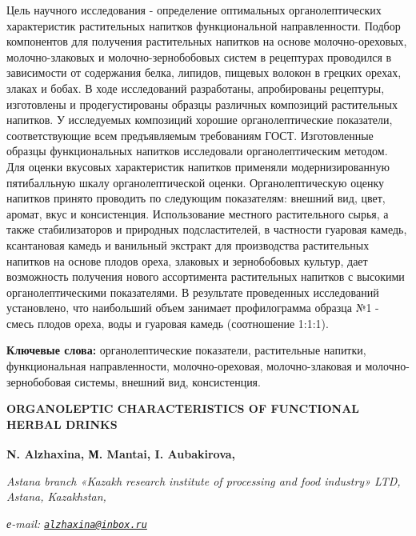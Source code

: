 {Цель научного исследования - определение оптимальных органолептических
характеристик растительных напитков функциональной направленности.
Подбор компонентов для получения растительных напитков на основе
молочно-ореховых, молочно-злаковых и молочно-зернобобовых систем в
рецептурах проводился в зависимости от содержания белка, липидов,
пищевых волокон в грецких орехах, злаках и бобах. В ходе исследований
разработаны, апробированы рецептуры, изготовлены и продегустированы
образцы различных композиций растительных напитков. У исследуемых
композиций хорошие органолептические показатели, соответствующие всем
предъявляемым требованиям ГОСТ. Изготовленные образцы функциональных
напитков исследовали органолептическим методом. Для оценки вкусовых
характеристик напитков применяли модернизированную пятибалльную шкалу
органолептической оценки. Органолептическую оценку напитков принято
проводить по следующим показателям: внешний вид, цвет, аромат, вкус и
консистенция. Использование местного растительного сырья, а также
стабилизаторов и природных подсластителей, в частности гуаровая камедь,
ксантановая камедь и ванильный экстракт для производства растительных
напитков на основе плодов ореха, злаковых и зернобобовых культур, дает
возможность получения нового ассортимента растительных напитков с
высокими органолептическими показателями. В результате проведенных
исследований установлено, что наибольший объем занимает профилограмма
образца №1 - смесь плодов ореха, воды и гуаровая камедь (соотношение
1:1:1).

{\bfseries Ключевые слова:} органолептические показатели, растительные
напитки, функциональная направленности, молочно-ореховая,
молочно-злаковая и молочно-зернобобовая системы, внешний вид,
консистенция.

{\bfseries ORGANOLEPTIC CHARACTERISTICS OF FUNCTIONAL HERBAL DRINKS}

{\bfseries N. Alzhaxina\textsuperscript{\envelope }, М. Mantai, I. Aubakirova,}

\emph{Astana branch «Kazakh research institute of processing and food
industry» LTD, Astana, Kazakhstan,}

\emph{е-mail:
\href{mailto:alzhaxina@inbox.ru}{\nolinkurl{alzhaxina@inbox.ru}}}

}
